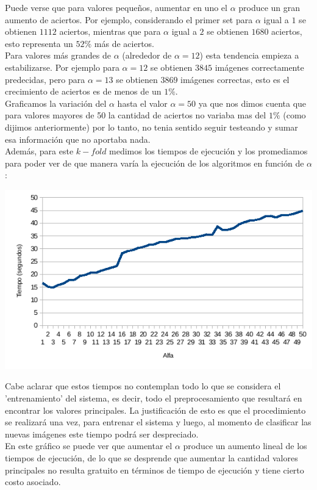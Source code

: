 Puede verse que para valores pequeños, aumentar en uno el $\alpha$ produce un gran aumento de aciertos. Por ejemplo, considerando el primer set para $\alpha$ igual a $1$ se obtienen $1112$ aciertos, mientras que para $\alpha$ igual a $2$ se obtienen $1680$ aciertos, esto representa un $52\%$ más de aciertos.
\\
Para valores más grandes de $\alpha$ (alrededor de $\alpha = 12$) esta tendencia empieza a estabilizarse. Por ejemplo para $\alpha = 12$ se obtienen $3845$ imágenes correctamente predecidas, pero para $\alpha = 13$ se obtienen $3869$ imágenes correctas, esto es el crecimiento de aciertos es de menos de un $1\%$.
\\
Graficamos la variación del $\alpha$ hasta el valor $\alpha = 50$ ya que nos dimos cuenta que para valores mayores de 50 la cantidad de aciertos no variaba mas del $1\%$ (como dijimos anteriormente) por lo tanto, no tenia sentido seguir testeando y sumar esa información que no aportaba nada.
\\
Además, para este $k-fold$ medimos los tiempos de ejecución y los promediamos para poder ver de que manera varía la ejecución de los algoritmos en función de $\alpha$:
\begin{center}
\includegraphics[scale=0.6]{nuevosResultados/pca/alfa/temp.png}
\end{center}
Cabe aclarar que estos tiempos no contemplan todo lo que se considera el 'entrenamiento' del sistema, es decir, todo el preprocesamiento que resultará en encontrar los valores principales. La justificación de esto es que el procedimiento se realizará una vez, para entrenar el sistema y luego, al momento de clasificar las nuevas imágenes este tiempo podrá ser despreciado.
\\
En este gráfico se puede ver que aumentar el $\alpha$ produce un aumento lineal de los tiempos de ejecución, de lo que se desprende que aumentar la cantidad valores principales no resulta gratuito en términos de tiempo de ejecución y tiene cierto costo asociado.
